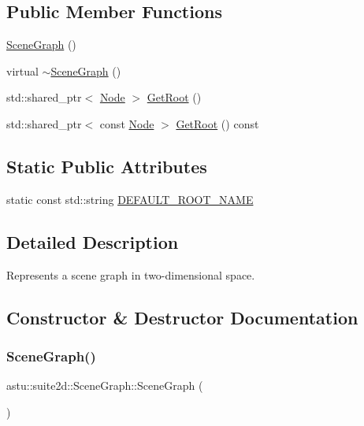 \subsection*{Public Member Functions}
\begin{DoxyCompactItemize}
\item 
\hyperlink{classastu_1_1suite2d_1_1SceneGraph_a2073f2c4a8e4645736a8797e87eb471d}{Scene\+Graph} ()
\item 
virtual \hyperlink{classastu_1_1suite2d_1_1SceneGraph_ad570ee1612322db96c9820c89d26bb32}{$\sim$\+Scene\+Graph} ()
\item 
std\+::shared\+\_\+ptr$<$ \hyperlink{classastu_1_1suite2d_1_1Node}{Node} $>$ \hyperlink{classastu_1_1suite2d_1_1SceneGraph_a8c24addab4c49f228fcf37feabaf9943}{Get\+Root} ()
\item 
std\+::shared\+\_\+ptr$<$ const \hyperlink{classastu_1_1suite2d_1_1Node}{Node} $>$ \hyperlink{classastu_1_1suite2d_1_1SceneGraph_a1151efe764bcba7d899bcb79650c45b6}{Get\+Root} () const
\end{DoxyCompactItemize}
\subsection*{Static Public Attributes}
\begin{DoxyCompactItemize}
\item 
static const std\+::string \hyperlink{classastu_1_1suite2d_1_1SceneGraph_aeecb669e9f201f03728ee6184df533f8}{D\+E\+F\+A\+U\+L\+T\+\_\+\+R\+O\+O\+T\+\_\+\+N\+A\+ME}
\end{DoxyCompactItemize}


\subsection{Detailed Description}
Represents a scene graph in two-\/dimensional space. 

\subsection{Constructor \& Destructor Documentation}
\mbox{\label{classastu_1_1suite2d_1_1SceneGraph_a2073f2c4a8e4645736a8797e87eb471d}} 
\subsubsection{\texorpdfstring{Scene\+Graph()}{SceneGraph()}}
{\footnotesize\ttfamily astu\+::suite2d\+::\+Scene\+Graph\+::\+Scene\+Graph (\begin{DoxyParamCaption}{ }\end{DoxyParamCaption})}

